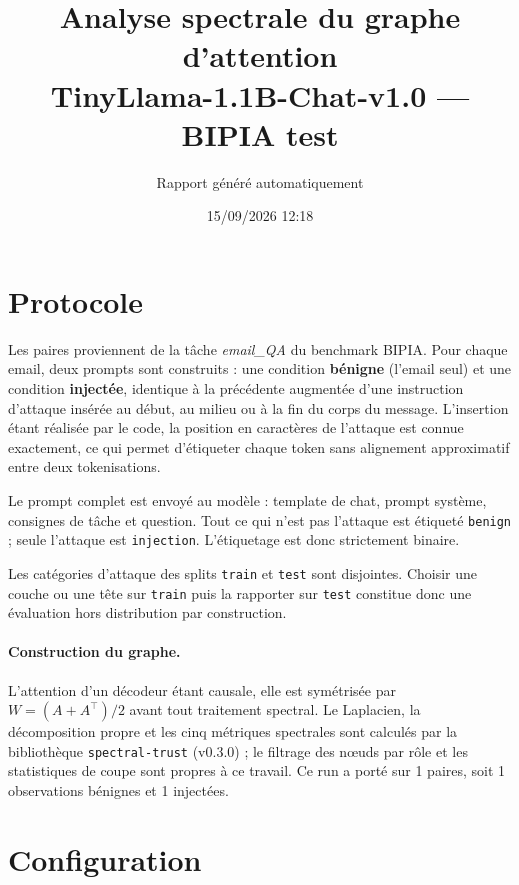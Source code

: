 \documentclass[11pt,a4paper]{article}
\title{Analyse spectrale du graphe d'attention\\TinyLlama-1.1B-Chat-v1.0 --- BIPIA test}
\author{Rapport généré automatiquement}
\date{15/09/2026 12:18}
\begin{document}
\maketitle

\section{Protocole}


Les paires proviennent de la tâche \emph{email\_QA} du benchmark BIPIA.
Pour chaque email, deux prompts sont construits : une condition \textbf{bénigne}
(l'email seul) et une condition \textbf{injectée}, identique à la précédente
augmentée d'une instruction d'attaque insérée au début, au milieu ou à la fin
du corps du message. L'insertion étant réalisée par le code, la position en
caractères de l'attaque est connue exactement, ce qui permet d'étiqueter chaque
token sans alignement approximatif entre deux tokenisations.

Le prompt complet est envoyé au modèle : template de chat, prompt système,
consignes de tâche et question. Tout ce qui n'est pas l'attaque est étiqueté
\texttt{benign} ; seule l'attaque est \texttt{injection}. L'étiquetage est
donc strictement binaire.

Les catégories d'attaque des splits \texttt{train} et \texttt{test} sont
disjointes. Choisir une couche ou une tête sur \texttt{train} puis la
rapporter sur \texttt{test} constitue donc une évaluation hors distribution
par construction.

\paragraph{Construction du graphe.} L'attention d'un décodeur étant causale,
elle est symétrisée par $W = (A + A^{\top})/2$ avant tout traitement spectral.
Le Laplacien, la décomposition propre et les cinq métriques spectrales sont
calculés par la bibliothèque \texttt{spectral-trust} (v0.3.0) ; le filtrage
des n\oe uds par rôle et les statistiques de coupe sont propres à ce travail.
Ce run a porté sur 1 paires, soit 1 observations bénignes et
1 injectées.


\section{Configuration}
\end{document}
